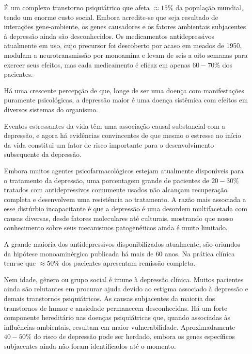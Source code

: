  É um complexo transtorno psiquiátrico que afeta $\approx 15\%$ da população mundial, tendo um enorme custo social. Embora acredite-se que seja resultado de interações gene-ambiente, os genes causadores e os fatores ambientais subjacentes à depressão ainda são desconhecidos. Os medicamentos antidepressivos atualmente em uso, cujo precursor foi descoberto por acaso em meados de 1950, modulam a neurotransmissão por monoamina e levam de seis a oito semanas para exercer seus efeitos, mas cada medicamento é eficaz em apenas $60 - 70\%$ dos pacientes. \cite{Wong2004} 

Há uma crescente percepção de que, longe de ser uma doença com manifestações puramente psicológicas, a depressão maior é uma doença sistêmica com efeitos em diversos sistemas do organismo. \cite{Charney2004}

Eventos estressantes da vida têm uma associação causal substancial com a depressão, e agora há evidências convincentes de que mesmo o estresse no início da vida constitui um fator de risco importante para o desenvolvimento subsequente da depressão. \cite{Charney2004}

Embora muitos agentes psicofarmacológicos estejam atualmente
disponíveis para o tratamento da depressão, uma porcentagem grande de pacientes de $20 - 30\%$ tratados com antidepressivos comumente usados não alcançam recuperação completa e desenvolvem uma resistência ao tratamento. A razão mais associada a esse distúrbio incapacitante é que a depressão é uma desordem multifacetada com causas diversas, desde fatores moleculares até culturais, mostrando que nosso conhecimento sobre seus mecanismos patogenéticos ainda é muito limitado. \cite{Kim} 

A grande maioria dos antidepressivos disponibilizados atualmente, são oriundos da hipótese monoaminérgica publicada há mais de 60 anos. Na prática clínica tem-se que $\approx 50\%$ dos pacientes apresentam remissão completa. \cite{Nestler2006} 

Nem idade, gênero ou grupo social é imune à depressão clínica. Muitos pacientes ainda são relutantes em procurar ajuda devido ao estigma associado à depressão e demais transtornos psiquiátricos. \cite{Jane2017} As causas subjacentes da maioria dos transtornos de humor e ansiedade permanecem desconhecidas. Há um forte componente hereditário nas doenças psiquiátricas que, quando associadas às influências ambientais, resultam em maior vulnerabilidade. \cite{Nemeroff2005} Aproximadamente $40-50\%$ do risco de depressão pode ser herdado, embora os genes específicos subjacentes ainda não foram identificados até o momento. \cite{Nestler2006}

